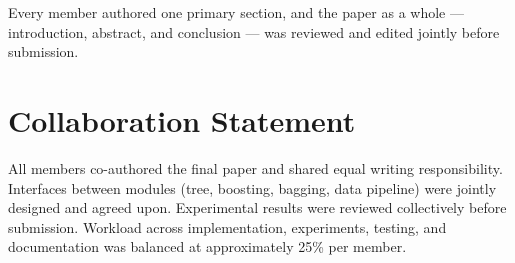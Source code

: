 \documentclass{article}
\begin{document}
\noindent Every member authored one primary section, and the paper as a whole --- introduction,
abstract, and conclusion --- was reviewed and edited jointly before submission.

\section*{Collaboration Statement}
All members co-authored the final paper and shared equal writing responsibility. Interfaces
between modules (tree, boosting, bagging, data pipeline) were jointly designed and agreed upon.
Experimental results were reviewed collectively before submission. Workload across
implementation, experiments, testing, and documentation was balanced at approximately 25\% per
member.
\end{document}
